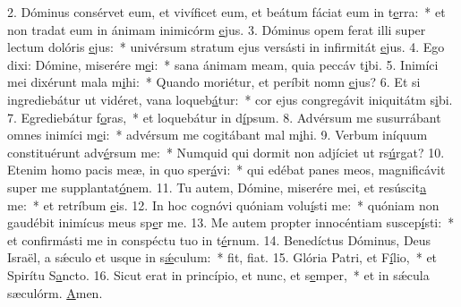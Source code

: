 2. Dóminus consérvet eum, et vivíficet eum, et beátum fáciat eum in t\uline{e}rra:~* et non tradat eum in ánimam inimicórm \uline{e}jus.
3. Dóminus opem ferat illi super lectum dolóris \uline{e}jus:~* univérsum stratum ejus versásti in infirmitát \uline{e}jus.
4. Ego dixi: Dómine, miserére m\uline{e}i:~* sana ánimam meam, quia peccáv t\uline{i}bi.
5. Inimíci mei dixérunt mala m\uline{i}hi:~* Quando moriétur, et períbit nomn \uline{e}jus?
6. Et si ingrediebátur ut vidéret, vana loqueb\uline{á}tur:~* cor ejus congregávit iniquitátm s\uline{i}bi.
7. Egrediebátur f\uline{o}ras,~* et loquebátur in d\uline{í}psum.
8. Advérsum me susurrábant omnes inimíci m\uline{e}i:~* advérsum me cogitábant mal m\uline{i}hi.
9. Verbum iníquum constituérunt adv\uline{é}rsum me:~* Numquid qui dormit non adjíciet ut rs\uline{ú}rgat?
10. Etenim homo pacis meæ, in quo sper\uline{á}vi:~* qui edébat panes meos, magnificávit super me supplantat\uline{ó}nem.
11. Tu autem, Dómine, miserére mei, et resúscit\uline{a} me:~* et retríbum \uline{e}is.
12. In hoc cognóvi quóniam volu\uline{í}sti me:~* quóniam non gaudébit inimícus meus sp\uline{e}r me.
13. Me autem propter innocéntiam suscep\uline{í}sti:~* et confirmásti me in conspéctu tuo in t\uline{é}rnum.
14. Benedíctus Dóminus, Deus Israël, a sǽculo et usque in s\uline{ǽ}culum:~* fit, f\uline{i}at.
15. Glória Patri, et F\uline{í}lio,~* et Spirítu S\uline{a}ncto.
16. Sicut erat in princípio, et nunc, et s\uline{e}mper,~* et in sǽcula sæculórm. \uline{A}men.

